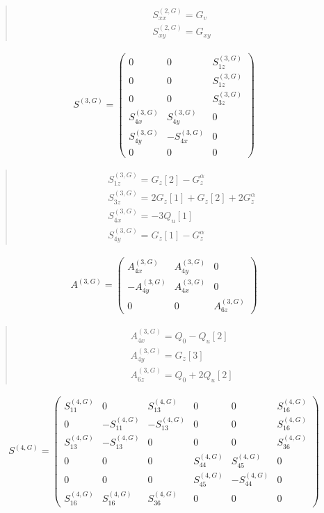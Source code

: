 \documentclass[fleqn,10pt]{jsarticle}
\begin{document}
\begin{quote}
\begin{align*}
& S^{(2,G)}_{xx} = G_{v} \\
& S^{(2,G)}_{xy} = G_{xy}
\end{align*}
\end{quote}
\begin{align*}
S^{(3,G)} = \begin{pmatrix} 0 & 0 & S^{(3,G)}_{1z} \\ 0 & 0 & S^{(3,G)}_{1z} \\ 0 & 0 & S^{(3,G)}_{3z} \\ S^{(3,G)}_{4x} & S^{(3,G)}_{4y} & 0 \\ S^{(3,G)}_{4y} & - S^{(3,G)}_{4x} & 0 \\ 0 & 0 & 0 \end{pmatrix}
\end{align*}
\begin{quote}
\begin{align*}
& S^{(3,G)}_{1z} = G_{z}[2] - G_{z}^{\alpha} \\
& S^{(3,G)}_{3z} = 2 G_{z}[1] + G_{z}[2] + 2 G_{z}^{\alpha} \\
& S^{(3,G)}_{4x} = - 3 Q_{u}[1] \\
& S^{(3,G)}_{4y} = G_{z}[1] - G_{z}^{\alpha}
\end{align*}
\end{quote}
\begin{align*}
A^{(3,G)} = \begin{pmatrix} A^{(3,G)}_{4x} & A^{(3,G)}_{4y} & 0 \\ - A^{(3,G)}_{4y} & A^{(3,G)}_{4x} & 0 \\ 0 & 0 & A^{(3,G)}_{6z} \end{pmatrix}
\end{align*}
\begin{quote}
\begin{align*}
& A^{(3,G)}_{4x} = Q_{0} - Q_{u}[2] \\
& A^{(3,G)}_{4y} = G_{z}[3] \\
& A^{(3,G)}_{6z} = Q_{0} + 2 Q_{u}[2]
\end{align*}
\end{quote}
\begin{align*}
S^{(4,G)} = \begin{pmatrix} S^{(4,G)}_{11} & 0 & S^{(4,G)}_{13} & 0 & 0 & S^{(4,G)}_{16} \\ 0 & - S^{(4,G)}_{11} & - S^{(4,G)}_{13} & 0 & 0 & S^{(4,G)}_{16} \\ S^{(4,G)}_{13} & - S^{(4,G)}_{13} & 0 & 0 & 0 & S^{(4,G)}_{36} \\ 0 & 0 & 0 & S^{(4,G)}_{44} & S^{(4,G)}_{45} & 0 \\ 0 & 0 & 0 & S^{(4,G)}_{45} & - S^{(4,G)}_{44} & 0 \\ S^{(4,G)}_{16} & S^{(4,G)}_{16} & S^{(4,G)}_{36} & 0 & 0 & 0 \end{pmatrix}
\end{align*}
\end{document}
